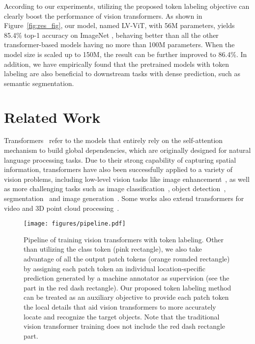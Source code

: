 \documentclass{article}
\newcommand{\nameofmethod}{LV-ViT}
\begin{document}
According to our experiments, utilizing the proposed token labeling objective can clearly boost the performance of vision transformers.
As shown in Figure~\ref{fig:res_fig}, our model, named \nameofmethod{}, with 56M parameters, yields
85.4\% top-1 accuracy on ImageNet \cite{deng2009imagenet}, behaving better than
all the other transformer-based models having no more than 100M parameters.
When the model size is scaled up to 150M, the result can be further improved to 86.4\%.
In addition, we have empirically found that the pretrained models with token labeling are also beneficial to downstream tasks with dense prediction, 
such as semantic segmentation.

\section{Related Work}

Transformers~\cite{vaswani2017attention} refer to the models that entirely rely on the self-attention mechanism to build global dependencies, which are originally designed for natural language processing tasks.
Due to their strong capability of capturing spatial information, transformers have also been successfully applied to a variety of vision problems, including low-level vision tasks like image enhancement~\cite{chen2020pre,yang2020learning}, as well as more challenging tasks
such as image classification~\cite{chen2020generative, dosovitskiy2020image}, object 
detection~\cite{carion2020end,dai2020up,zheng2020end,zhu2020deformable},
segmentation~\cite{chen2020pre,sun2020rethinking,wang2020end} and image generation~\cite{parmar2018image}. 
Some works also extend transformers for video and 3D point cloud processing~\cite{zeng2020learning,zhao2020point,zhou2018end}.


\begin{figure*}[t]
    \centering
    \small
    \texttt{[image: figures/pipeline.pdf]}
    \caption{Pipeline of training vision transformers with token labeling. Other than utilizing the class token (pink rectangle), we also take advantage of all the output patch tokens (orange rounded rectangle) by assigning each patch token an individual location-specific prediction generated by a machine annotator \cite{brock2021high} as supervision (see the part in the red dash rectangle).
    Our proposed token labeling method can be treated as an auxiliary objective to provide each patch token the local details that aid vision transformers to more accurately locate and recognize the target objects. Note that the traditional vision transformer training does not include the red dash rectangle part.}
    \label{fig:arch}
\end{figure*}
\end{document}
